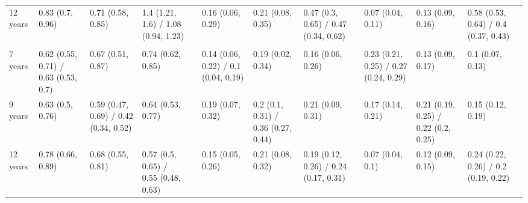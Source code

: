 \begin{tabular}{llllrlllrlllr}
  12 years                                                      & 0.83 (0.7, 0.96)                          & 0.71 (0.58, 0.85)                           & 1.4 (1.21, 1.6) / 1.08 (0.94, 1.23)       &  & 0.16 (0.06, 0.29)                     & 0.21 (0.08, 0.35)                     & 0.47 (0.3, 0.65) / 0.47 (0.34, 0.62)  &  & 0.07 (0.04, 0.11)                     & 0.13 (0.09, 0.16)                     & 0.58 (0.53, 0.64) / 0.4 (0.37, 0.43)  & \\
                                                                & \multicolumn{3}{c}{}                      &                                             & \multicolumn{3}{c}{}                      &  & \multicolumn{3}{c}{}                  & \\
  7 years                                                       & 0.62 (0.55, 0.71) / 0.63 (0.53, 0.7)      & 0.67 (0.51, 0.87)                           & 0.74 (0.62, 0.85)                         &  & 0.14 (0.06, 0.22) / 0.1 (0.04, 0.19)  & 0.19 (0.02, 0.34)                     & 0.16 (0.06, 0.26)                     &  & 0.23 (0.21, 0.25) / 0.27 (0.24, 0.29) & 0.13 (0.09, 0.17)                     & 0.1 (0.07, 0.13)                      & \\
  9 years                                                       & 0.63 (0.5, 0.76)                          & 0.59 (0.47, 0.69) / 0.42 (0.34, 0.52)       & 0.64 (0.53, 0.77)                         &  & 0.19 (0.07, 0.32)                     & 0.2 (0.1, 0.31) / 0.36 (0.27, 0.44)   & 0.21 (0.09, 0.31)                     &  & 0.17 (0.14, 0.21)                     & 0.21 (0.19, 0.25) / 0.22 (0.2, 0.25)  & 0.15 (0.12, 0.19)                     & \\
  12 years                                                      & 0.78 (0.66, 0.89)                         & 0.68 (0.55, 0.81)                           & 0.57 (0.5, 0.65) / 0.55 (0.48, 0.63)      &  & 0.15 (0.05, 0.26)                     & 0.21 (0.08, 0.32)                     & 0.19 (0.12, 0.26) / 0.24 (0.17, 0.31) &  & 0.07 (0.04, 0.1)                      & 0.12 (0.09, 0.15)                     & 0.24 (0.22, 0.26) / 0.2 (0.19, 0.22)  & \\
  \bottomrule
\end{tabular}%
